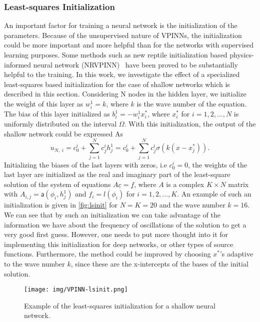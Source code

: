 \subsubsection{Least-squares Initialization}\label{sec:lsinit}
An important factor for training a neural network is the initialization of the parameters. Because of the unsupervised nature of VPINNs, the initialization could be more important and more helpful than for the networks with supervised learning purposes. Some methods such as new reptile initialization based physics-informed neural network (NRVPINN)~\cite{liu2021init} have been proved to be substantially helpful to the training. In this work, we investigate the effect of a specialized least-squares based initialization for the case of shallow networks which is described in this section. Considering N nodes in the hidden layer, we initialize the weight of this layer as $w^{1}_{i} = k$, where $k$ is the wave number of the equation. The bias of this layer initialized as $b^{1}_{i} = -w^{1}_{i} x^{*}_{i}$, where $x^{*}_{i}$ for $i=1,2,...,N$ is uniformly distributed on the interval $\Omega$. With this initialization, the output of the shallow network could be expressed As
\begin{equation}
    u_{N,\;i} = c_0^i + \sum_{j=1}^{N}{c_j^i h^1_j} = c_0^i + \sum_{j=1}^{N}{c_j^i \sigma(k(x-x^{*}_j))}.
\end{equation}
Initializing the biases of the last layers with zeros, i.e $c_0^i = 0$, the weights of the last layer are initialized as the real and imaginary part of the least-square solution of the system of equations $A\underline{c}=\underline{f}$, where $A$ is a complex $K \times N$ matrix with $A_{i, j}=\mathsf{a}(\phi_i, h^1_j)$ and $f_i = l(\phi_i)$ for $i=1,2,...,K$. An example of such an initialization is given in \autoref{fig:lsinit} for $N=K=20$ and the wave number $k=16$. We can see that by such an initialization we can take advantage of the information we have about the frequency of oscillations of the solution to get a very good first guess. However, one needs to put more thought into it for implementing this initialization for deep networks, or other types of source functions. Furthermore, the method could be improved by choosing $x^{*}$'s adaptive to the wave number $k$, since these are the x-intercepts of the bases of the initial solution.

\begin{figure}[h!]
    \centering
    \texttt{[image: img/VPINN-lsinit.png]}
    \caption{Example of the least-squares initialization for a shallow neural network.}
    \label{fig:lsinit}
\end{figure}

